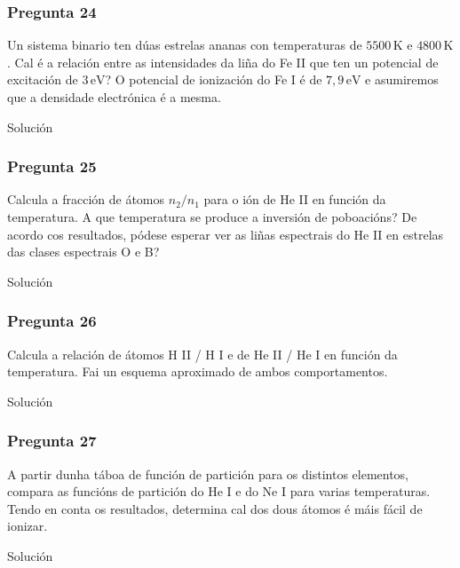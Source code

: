 \vspace*{2em}

\begin{Enunciado}
	\subsubsection{Pregunta 24}

	Un sistema binario ten dúas estrelas ananas con temperaturas de $5500\,\text{K}$ e $4800\,\text{K}$. Cal é a relación entre as intensidades da liña do Fe II que ten un potencial de excitación de $3\,\text{eV}$? O potencial de ionización do Fe I é de $7{,}9\,\text{eV}$ e asumiremos que a densidade electrónica é a mesma.

\end{Enunciado}
Solución

\vspace*{2em}

\begin{Enunciado}
	\subsubsection{Pregunta 25}

	Calcula a fracción de átomos $n_2/n_1$ para o ión de He II en función da temperatura. A que temperatura se produce a inversión de poboacións? De acordo cos resultados, pódese esperar ver as liñas espectrais do He II en estrelas das clases espectrais O e B?

\end{Enunciado}
Solución

\vspace*{2em}

\begin{Enunciado}
	\subsubsection{Pregunta 26}

	Calcula a relación de átomos H II / H I e de He II / He I en función da temperatura. Fai un esquema aproximado de ambos comportamentos.

\end{Enunciado}
Solución

\vspace*{2em}

\begin{Enunciado}
	\subsubsection{Pregunta 27}

	A partir dunha táboa de función de partición para os distintos elementos, compara as funcións de partición do He I e do Ne I para varias temperaturas. Tendo en conta os resultados, determina cal dos dous átomos é máis fácil de ionizar.

\end{Enunciado}
Solución

